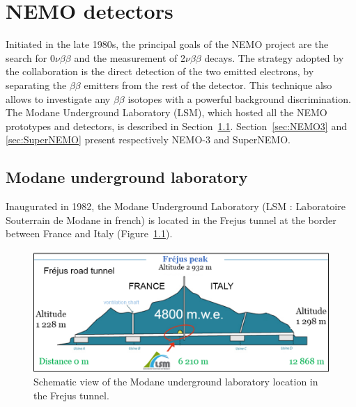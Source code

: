 \documentclass[main.tex]{subfiles}
\begin{document}
\chapter{NEMO detectors}




\NI Initiated in the late 1980s, the principal goals of the NEMO project are the search for 0$\nu\beta\beta$ and the measurement of 2$\nu\beta\beta$ decays. The strategy adopted by the collaboration is the direct detection of the two emitted electrons, by separating the $\beta\beta$ emitters from the rest of the detector. This technique also allows to investigate any $\beta\beta$ isotopes with a powerful background discrimination. The Modane Underground Laboratory (LSM), which hosted all the NEMO prototypes and detectors, is described in Section~\ref{sec:LSM}. Section~\ref{sec:NEMO3} and \ref{sec:SuperNEMO} present respectively NEMO-3 and SuperNEMO.


\section{Modane underground laboratory}\label{sec:LSM}


\NI Inaugurated in 1982, the Modane Underground Laboratory (LSM : Laboratoire Souterrain de Modane in french) is located in the Frejus tunnel at the border between France and Italy (Figure~\ref{LSMtunnel}).


\begin{figure}[h!]
\begin{center}
\includegraphics[scale=0.35]{pictures/Chap3/LSMtunnel.png}
\caption{Schematic view of the Modane underground laboratory location in the Frejus tunnel.}
\label{LSMtunnel}
\end{center}
\end{figure}
\end{document}
